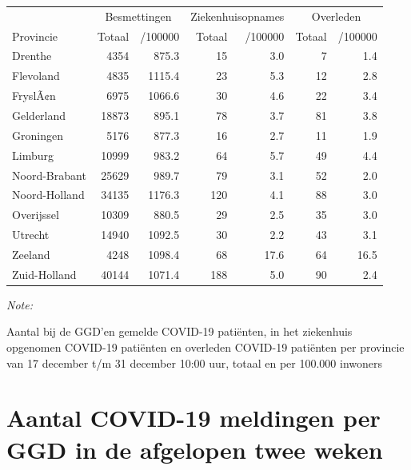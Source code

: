 \documentclass[
  english,
  man,floatsintext]{apa6}
\begin{document}
\begin{table}
\centering
\begin{threeparttable}
\begin{tabular}{lrrrrrr}
\toprule
\multicolumn{1}{c}{ } & \multicolumn{2}{c}{Besmettingen} & \multicolumn{2}{c}{Ziekenhuisopnames} & \multicolumn{2}{c}{Overleden} \\
\cmidrule(l{3pt}r{3pt}){2-3} \cmidrule(l{3pt}r{3pt}){4-5} \cmidrule(l{3pt}r{3pt}){6-7}
Provincie & Totaal & /100000 & Totaal & /100000 & Totaal & /100000\\
\midrule
Drenthe & 4354 & 875.3 & 15 & 3.0 & 7 & 1.4\\
Flevoland & 4835 & 1115.4 & 23 & 5.3 & 12 & 2.8\\
FryslÃ¢n & 6975 & 1066.6 & 30 & 4.6 & 22 & 3.4\\
Gelderland & 18873 & 895.1 & 78 & 3.7 & 81 & 3.8\\
Groningen & 5176 & 877.3 & 16 & 2.7 & 11 & 1.9\\
Limburg & 10999 & 983.2 & 64 & 5.7 & 49 & 4.4\\
Noord-Brabant & 25629 & 989.7 & 79 & 3.1 & 52 & 2.0\\
Noord-Holland & 34135 & 1176.3 & 120 & 4.1 & 88 & 3.0\\
Overijssel & 10309 & 880.5 & 29 & 2.5 & 35 & 3.0\\
Utrecht & 14940 & 1092.5 & 30 & 2.2 & 43 & 3.1\\
Zeeland & 4248 & 1098.4 & 68 & 17.6 & 64 & 16.5\\
Zuid-Holland & 40144 & 1071.4 & 188 & 5.0 & 90 & 2.4\\
\bottomrule
\end{tabular}
\begin{tablenotes}
\item \textit{Note: } 
\item Aantal bij de GGD’en gemelde COVID-19 patiënten, in het ziekenhuis opgenomen COVID-19 patiënten en overleden COVID-19 patiënten per provincie van 17 december t/m 31 december 10:00 uur, totaal en per 100.000 inwoners
\end{tablenotes}
\end{threeparttable}
\end{table}

\newpage

\hypertarget{aantal-covid-19-meldingen-per-ggd-in-de-afgelopen-twee-weken}{%
\section{Aantal COVID-19 meldingen per GGD in de afgelopen twee weken}\label{aantal-covid-19-meldingen-per-ggd-in-de-afgelopen-twee-weken}}
\end{document}
